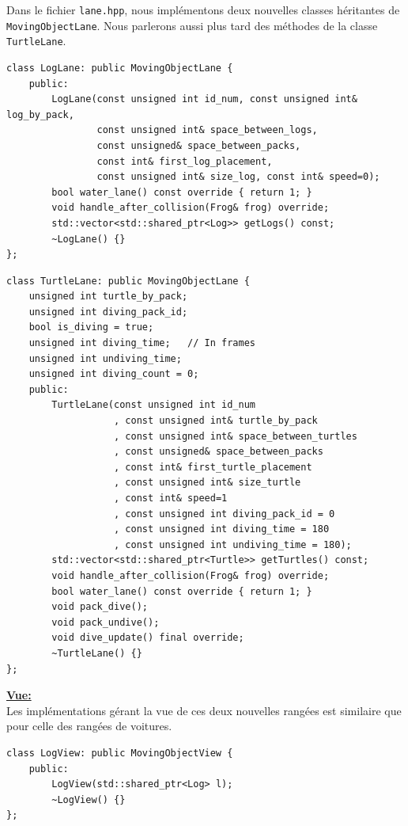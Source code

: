 \documentclass[a4paper, 12pt]{article}
\begin{document}
Dans le fichier \texttt{lane.hpp}, nous implémentons deux nouvelles classes héritantes de \texttt{MovingObjectLane}. 
Nous parlerons aussi plus tard des méthodes de la classe \texttt{TurtleLane}. \\

\begin{lstlisting}
class LogLane: public MovingObjectLane {
    public:
        LogLane(const unsigned int id_num, const unsigned int& log_by_pack,
                const unsigned int& space_between_logs,
                const unsigned& space_between_packs,
                const int& first_log_placement,
                const unsigned int& size_log, const int& speed=0);
        bool water_lane() const override { return 1; }
        void handle_after_collision(Frog& frog) override;
        std::vector<std::shared_ptr<Log>> getLogs() const;
        ~LogLane() {}
};
\end{lstlisting}

\begin{lstlisting}
class TurtleLane: public MovingObjectLane {
    unsigned int turtle_by_pack;
    unsigned int diving_pack_id;
    bool is_diving = true;
    unsigned int diving_time;   // In frames
    unsigned int undiving_time;
    unsigned int diving_count = 0;
    public:
        TurtleLane(const unsigned int id_num
                   , const unsigned int& turtle_by_pack
                   , const unsigned int& space_between_turtles
                   , const unsigned& space_between_packs
                   , const int& first_turtle_placement
                   , const unsigned int& size_turtle
                   , const int& speed=1
                   , const unsigned int diving_pack_id = 0
                   , const unsigned int diving_time = 180
                   , const unsigned int undiving_time = 180);
        std::vector<std::shared_ptr<Turtle>> getTurtles() const;
        void handle_after_collision(Frog& frog) override;
        bool water_lane() const override { return 1; }
        void pack_dive();
        void pack_undive();
        void dive_update() final override;
        ~TurtleLane() {}
};
\end{lstlisting} \hspace{0.5cm}


\underline{\textbf{Vue:}} \\
Les implémentations gérant la vue de ces deux nouvelles rangées est similaire que pour celle des rangées de voitures. \\
\begin{lstlisting}
class LogView: public MovingObjectView {
    public:
        LogView(std::shared_ptr<Log> l);
        ~LogView() {}
};
\end{lstlisting}
\end{document}
